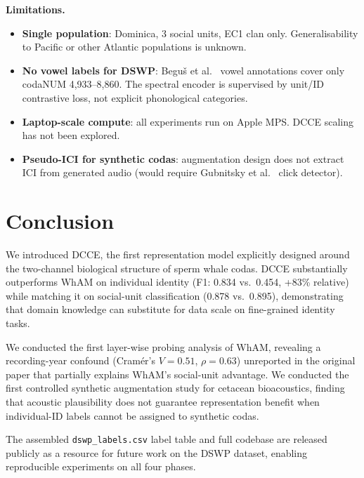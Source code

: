 \documentclass[9pt,a4paper,twocolumn,twoside]{rho-class/rho}
\begin{document}
\textbf{Limitations.}
\begin{itemize}
\item \textbf{Single population}: Dominica, 3 social units, EC1 clan only. Generalisability to Pacific or other Atlantic populations is unknown.
\item \textbf{No vowel labels for DSWP}: Beguš et al.\ \cite{begus2024vowels} vowel annotations cover only codaNUM 4,933--8,860. The spectral encoder is supervised by unit/ID contrastive loss, not explicit phonological categories.
\item \textbf{Laptop-scale compute}: all experiments run on Apple MPS. DCCE scaling has not been explored.
\item \textbf{Pseudo-ICI for synthetic codas}: augmentation design does not extract ICI from generated audio (would require Gubnitsky et al.\ \cite{gubnitsky2024coda} click detector).
\end{itemize}

\section{Conclusion}
\label{sec:conclusion}

We introduced DCCE, the first representation model explicitly designed around the two-channel biological structure of sperm whale codas. DCCE substantially outperforms WhAM on individual identity (F1: 0.834 vs.\ 0.454, +83\% relative) while matching it on social-unit classification (0.878 vs.\ 0.895), demonstrating that domain knowledge can substitute for data scale on fine-grained identity tasks.

We conducted the first layer-wise probing analysis of WhAM, revealing a recording-year confound (Cram\'{e}r's $V=0.51$, $\rho=0.63$) unreported in the original paper that partially explains WhAM's social-unit advantage. We conducted the first controlled synthetic augmentation study for cetacean bioacoustics, finding that acoustic plausibility does not guarantee representation benefit when individual-ID labels cannot be assigned to synthetic codas.

The assembled \texttt{dswp\_labels.csv} label table and full codebase are released publicly as a resource for future work on the DSWP dataset, enabling reproducible experiments on all four phases.

\printbibliography

\end{document}

